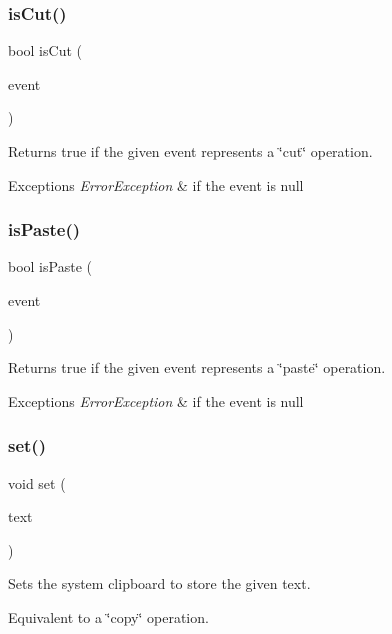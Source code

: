 \subsubsection{\texorpdfstring{is\+Cut()}{isCut()}}
{\footnotesize\ttfamily bool is\+Cut (\begin{DoxyParamCaption}\item[{Q\+Key\+Event $\ast$}]{event }\end{DoxyParamCaption})\hspace{0.3cm}{\ttfamily [static]}}



Returns true if the given event represents a \char`\"{}cut\char`\"{} operation. 


\begin{DoxyExceptions}{Exceptions}
{\em Error\+Exception} & if the event is null \\
\hline
\end{DoxyExceptions}
\mbox{\label{classsgl_1_1GClipboard_a26e3ab35c80c96117dd4bb455cf38c82}} 
\subsubsection{\texorpdfstring{is\+Paste()}{isPaste()}}
{\footnotesize\ttfamily bool is\+Paste (\begin{DoxyParamCaption}\item[{Q\+Key\+Event $\ast$}]{event }\end{DoxyParamCaption})\hspace{0.3cm}{\ttfamily [static]}}



Returns true if the given event represents a \char`\"{}paste\char`\"{} operation. 


\begin{DoxyExceptions}{Exceptions}
{\em Error\+Exception} & if the event is null \\
\hline
\end{DoxyExceptions}
\mbox{\label{classsgl_1_1GClipboard_a59ad3e94e40e8ef08c8a69a3a67377df}} 
\subsubsection{\texorpdfstring{set()}{set()}}
{\footnotesize\ttfamily void set (\begin{DoxyParamCaption}\item[{const std\+::string \&}]{text }\end{DoxyParamCaption})\hspace{0.3cm}{\ttfamily [static]}}



Sets the system clipboard to store the given text. 

Equivalent to a \char`\"{}copy\char`\"{} operation. 
